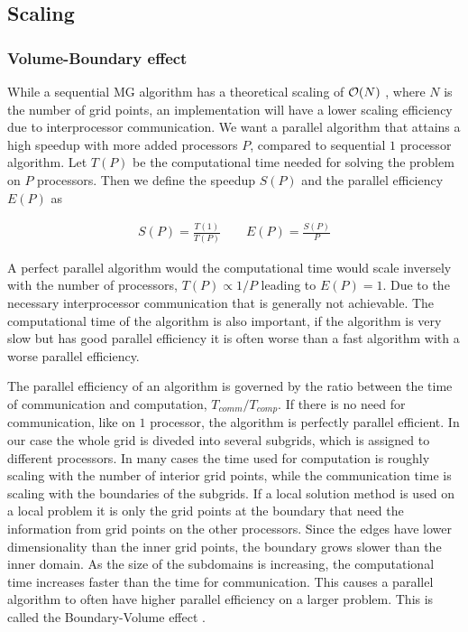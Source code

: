 	\subsection{Scaling}
		\subsubsection{Volume-Boundary effect}
		While a sequential MG algorithm has a theoretical scaling of \(\order{N}\)
		\citep{press_numerical_1988}, where \(N\) is the number of grid points, an
		implementation will have a lower scaling efficiency due to interprocessor
		communication. We want a parallel algorithm that attains a high speedup with
		more added processors \(P\),  compared to sequential \(1\) processor algorithm.
		Let \(T(P)\) be the computational time needed for solving the problem on \(P\)
		processors. Then we define the speedup \(S(P)\) and the parallel efficiency \(E(P)\) as

		\begin{align}
			S(P) = \frac{T(1)}{T(P)} \qquad E(P) = \frac{S(P)}{P}
		\end{align}

		A perfect parallel algorithm would the computational time would scale inversely
		with the number of processors, \(T(P) \propto 1/P\) leading to \( E(P) =1 \).
		Due to the necessary interprocessor communication that is generally not
		achievable. The computational time of the algorithm is also important, if
		the algorithm is very slow but has good parallel efficiency it is often
		worse than a fast algorithm with a worse parallel efficiency.

		The parallel efficiency of an algorithm is governed by the ratio between the
		time of communication and computation, \(T_{comm}/T_{comp}\). If there is no
		need for communication, like on \(1\) processor, the algorithm is perfectly
		parallel efficient. In our case the whole grid is diveded into several subgrids,
		which is assigned to different processors. In many cases the time used for
		computation is roughly scaling with the number of interior grid points, while the
		communication time is scaling with the boundaries of the subgrids. If a
		local solution method is used on a local problem it is only the grid points
		at the boundary that need the information from grid points on the other
		processors. Since the edges have lower dimensionality than the inner grid
		points, the boundary grows slower than the inner domain. As the size of the subdomains is increasing,
		the computational time increases
		faster than the time for communication. This causes a parallel algorithm to often have
		higher parallel efficiency on a larger problem. This is called the Boundary-Volume effect \citep{trottenberg_multigrid_2000}.

